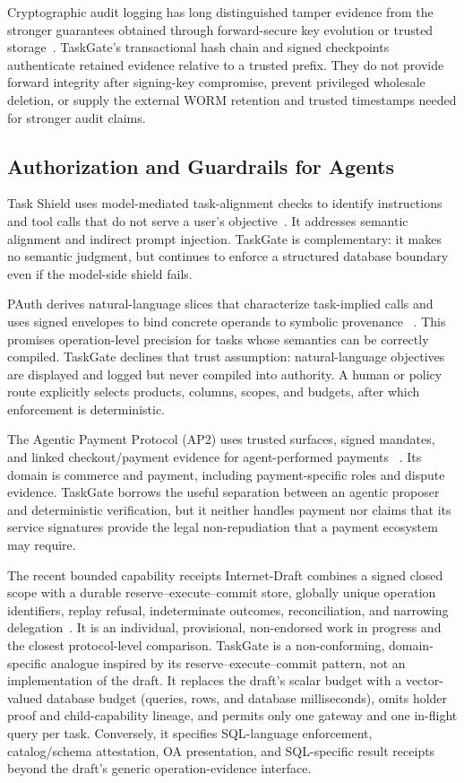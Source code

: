 \documentclass[10pt,journal,compsoc]{IEEEtran}
\newcommand{\system}{TaskGate\xspace}
\begin{document}
Cryptographic audit logging has long distinguished tamper evidence from the
stronger guarantees obtained through forward-secure key evolution or trusted
storage~\cite{schneier1999audit}.  \system's transactional hash chain and signed
checkpoints authenticate retained evidence relative to a trusted prefix.  They
do not provide forward integrity after signing-key compromise, prevent
privileged wholesale deletion, or supply the external WORM retention and trusted
timestamps needed for stronger audit claims.

\subsection{Authorization and Guardrails for Agents}

Task Shield uses model-mediated task-alignment checks to identify instructions
and tool calls that do not serve a user's objective~\cite{jia2025taskshield}.
It addresses semantic alignment and indirect prompt injection.  \system is
complementary: it makes no semantic judgment, but continues to enforce a
structured database boundary even if the model-side shield fails.

PAuth derives natural-language slices that characterize task-implied calls and
uses signed envelopes to bind concrete operands to symbolic provenance
~\cite{sharma2026pauth}.  This promises operation-level precision for tasks
whose semantics can be correctly compiled.  \system declines that trust
assumption: natural-language objectives are displayed and logged but never
compiled into authority.  A human or policy route explicitly selects products,
columns, scopes, and budgets, after which enforcement is deterministic.

The Agentic Payment Protocol (AP2) uses trusted surfaces, signed mandates, and
linked checkout/payment evidence for agent-performed payments
~\cite{ap2v02}.  Its domain is commerce and payment, including payment-specific
roles and dispute evidence.  \system borrows the useful separation between an
agentic proposer and deterministic verification, but it neither handles payment
nor claims that its service signatures provide the legal non-repudiation that a
payment ecosystem may require.

The recent bounded capability receipts Internet-Draft combines a signed closed
scope with a durable reserve--execute--commit store, globally unique operation
identifiers, replay refusal, indeterminate outcomes, reconciliation, and
narrowing delegation~\cite{schrock2026bounded}.  It is an individual,
provisional, non-endorsed work in progress and the closest protocol-level
comparison.  \system is a non-conforming, domain-specific
analogue inspired by its reserve--execute--commit pattern, not an implementation
of the draft.  It replaces the draft's scalar budget with a vector-valued
database budget (queries, rows, and database milliseconds), omits holder proof
and child-capability lineage, and permits only one gateway and one in-flight
query per task.  Conversely, it specifies SQL-language enforcement,
catalog/schema attestation, OA presentation, and SQL-specific result receipts
beyond the draft's generic operation-evidence interface.
\end{document}
